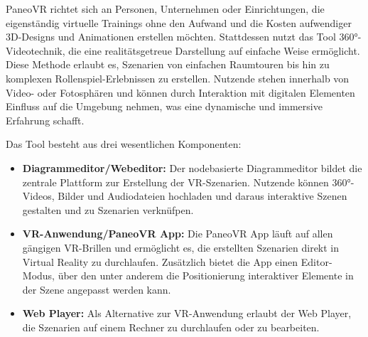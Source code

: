 PaneoVR richtet sich an Personen, Unternehmen oder Einrichtungen, die eigenständig virtuelle Trainings ohne den Aufwand und die Kosten aufwendiger 3D-Designs und Animationen erstellen möchten. Stattdessen nutzt das Tool 360°-Videotechnik, die eine realitätsgetreue Darstellung auf einfache Weise ermöglicht. Diese Methode erlaubt es, Szenarien von einfachen Raumtouren bis hin zu komplexen Rollenspiel-Erlebnissen zu erstellen. Nutzende stehen innerhalb von Video- oder Fotosphären und können durch Interaktion mit digitalen Elementen Einfluss auf die Umgebung nehmen, was eine dynamische und immersive Erfahrung schafft.

Das Tool besteht aus drei wesentlichen Komponenten:

\begin{itemize}
    \item \textbf{Diagrammeditor/Webeditor:}
    Der nodebasierte Diagrammeditor bildet die zentrale Plattform zur Erstellung der VR-Szenarien. Nutzende können 360°-Videos, Bilder und Audiodateien hochladen und daraus interaktive Szenen gestalten und zu Szenarien verknüfpen. 
    \item \textbf{VR-Anwendung/PaneoVR App:}
    Die PaneoVR App läuft auf allen gängigen VR-Brillen und ermöglicht es, die erstellten Szenarien direkt in Virtual Reality zu durchlaufen. Zusätzlich bietet die App einen Editor-Modus, über den unter anderem die Positionierung interaktiver Elemente in der Szene angepasst werden kann. 
    \item \textbf{Web Player:}
    Als Alternative zur VR-Anwendung erlaubt der Web Player, die Szenarien auf einem Rechner zu durchlaufen oder zu bearbeiten.
\end{itemize}

